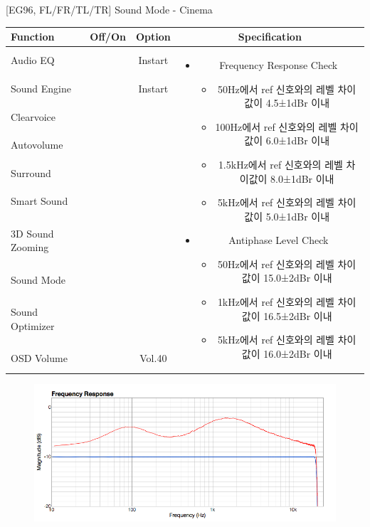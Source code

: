 \documentclass{beamer}
\begin{document}
\begin{frame}[t]{[EG96, FL/FR/TL/TR] Sound Mode - Cinema}
\begin{tiny}
\begin{tabular}{@{}lccc@{}}
\toprule
Function & Off/On & Option & Specification \\
\midrule
Audio EQ & \color{black}{Off} & Instart &
\multirow{10}{60mm}{
\begin{itemize}
\item Frequency Response Check
	\begin{itemize}
	\item 50Hz에서 ref 신호와의 레벨 차이값이 4.5±1dBr 이내
	\item 100Hz에서 ref 신호와의 레벨 차이값이 6.0±1dBr 이내
	\item 1.5kHz에서 ref 신호와의 레벨 차이값이 8.0±1dBr 이내
	\item 5kHz에서 ref 신호와의 레벨 차이값이 5.0±1dBr 이내
	\end{itemize}
\item Antiphase Level Check
	\begin{itemize}
	\item 50Hz에서 ref 신호와의 레벨 차이값이 15.0±2dBr 이내
	\item 1kHz에서 ref 신호와의 레벨 차이값이 16.5±2dBr 이내
	\item 5kHz에서 ref 신호와의 레벨 차이값이 16.0±2dBr 이내
	\end{itemize}
\end{itemize}
} \\
Sound Engine & \color{blue}{On} & Instart & \\
Clearvoice & \color{black}{Off} & & \\
Autovolume & \color{black}{Off} & & \\
Surround & \color{black}{Off} & & \\
Smart Sound & \color{black}{Off} & & \\
3D Sound Zooming & \color{black}{Off} & & \\
Sound Mode & \color{blue}{On} & \color{blue}{Cinema} & \\
Sound Optimizer & \color{black}{Off} & & \\
OSD Volume & \color{blue}{On} & Vol.40 & \\
\midrule
\end{tabular}
\end{tiny}

\begin{figure}[b]
\includegraphics[height=0.4\textwidth]{figure/EG96/cinema.png}
\end{figure}

\end{frame}
\end{document}
